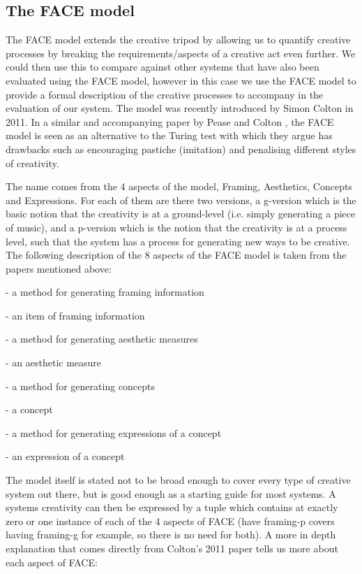 \documentclass[pdftex,12pt,a4paper]{report}
\begin{document}
\subsection{The FACE model}
The FACE model extends the creative tripod by allowing us to quantify creative processes by breaking the requirements/aspects of a creative act even further. We could then use this to compare against other systems that have also been evaluated using the FACE model, however in this case we use the FACE model to provide a formal description of the creative processes to accompany in the evaluation of our system. The model was recently introduced by Simon Colton in 2011\cite{coltonface2011}. In a similar and accompanying paper by Pease and Colton \cite{pease11}, the FACE model is seen as an alternative to the Turing test with which they argue has drawbacks such as encouraging pastiche (imitation) and penalising different styles of creativity. 

The name comes from the 4 aspects of the model, Framing, Aesthetics, Concepts and Expressions. For each of them are there two versions, a g-version which is the basic notion that the creativity is at a ground-level (i.e. simply generating a piece of music), and a p-version which is the notion that the creativity is at a process level, such that the system has a process for generating new ways to be creative. The following description of the 8 aspects of the FACE model is taken from the papers mentioned above:

\begin{description} [labelindent=0.6cm]  \itemsep0pt \parskip0pt  
  \item[$F^{p}$] - a method for generating framing information
  \item[$F^{g}$] - an item of framing information
  \item[$A^{p}$] - a method for generating aesthetic measures 
  \item[$A^{g}$] - an aesthetic measure
  \item[$C^{p}$] - a method for generating concepts 
  \item[$C^{g}$] - a concept
  \item[$E^{p}$] - a method for generating expressions of a concept 
  \item[$E^{g}$] - an expression of a concept 
\end{description}

The model itself is stated not to be broad enough to cover every type of creative system out there, but is good enough as a starting guide for most systems. A systems creativity can then be expressed by a tuple which contains at exactly zero or one instance of each of the 4 aspects of FACE (have framing-p covers having framing-g for example, so there is no need for both). A more in depth explanation that comes directly from Colton's 2011 paper \cite{coltonface2011} tells us more about each aspect of FACE:
\end{document}
